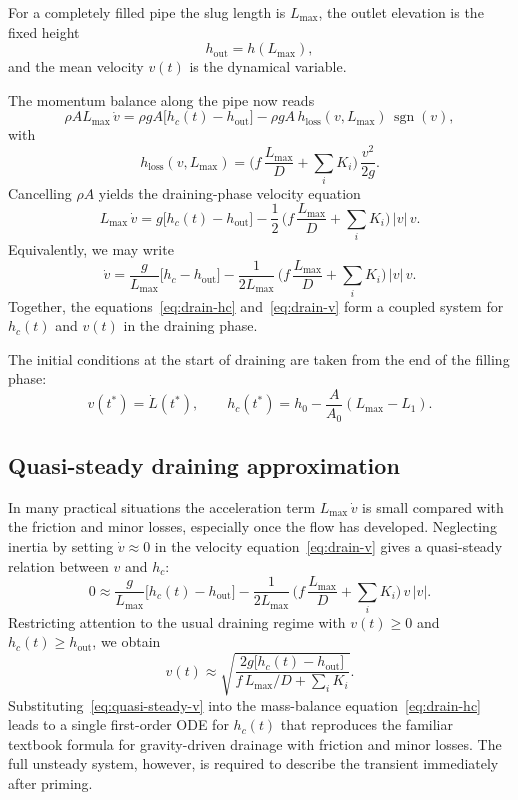 \documentclass[11pt]{article}
\begin{document}
For a completely filled pipe the slug length is $L_{\max}$, the outlet elevation is the fixed height
\[
  h_{\text{out}} = h(L_{\max}),
\]
and the mean velocity $v(t)$ is the dynamical variable.

The momentum balance along the pipe now reads
\[
  \rho A L_{\max}\,\dot v
  = \rho g A\bigl[h_c(t) - h_{\text{out}}\bigr]
    - \rho g A\,h_{\text{loss}}(v,L_{\max})\,\operatorname{sgn}(v),
\]
with
\[
  h_{\text{loss}}(v,L_{\max})
  = \Big(f\,\frac{L_{\max}}{D} + \sum_i K_i\Big)\,\frac{v^2}{2g}.
\]
Cancelling $\rho A$ yields the draining-phase velocity equation
\begin{equation}
  L_{\max}\,\dot v
  = g\bigl[h_c(t) - h_{\text{out}}\bigr]
    - \frac{1}{2}\,\Big(f\,\frac{L_{\max}}{D} + \sum_i K_i\Big)\,|v|\,v.
  \label{eq:drain-v-L}
\end{equation}
Equivalently, we may write
\begin{equation}
  \dot v
  = \frac{g}{L_{\max}}\bigl[h_c - h_{\text{out}}\bigr]
    - \frac{1}{2L_{\max}}\,\Big(f\,\frac{L_{\max}}{D} + \sum_i K_i\Big)\,|v|\,v.
  \label{eq:drain-v}
\end{equation}
Together, the equations~\eqref{eq:drain-hc} and~\eqref{eq:drain-v}
form a coupled system for $h_c(t)$ and $v(t)$ in the draining phase.

The initial conditions at the start of draining are taken from the end of the filling phase:
\[
  v(t^*) = \dot L(t^*),\qquad
  h_c(t^*) = h_0 - \frac{A}{A_0}(L_{\max} - L_1).
\]

\subsection{Quasi-steady draining approximation}

In many practical situations the acceleration term $L_{\max}\,\dot v$ is small compared with the
friction and minor losses, especially once the flow has developed. Neglecting inertia by
setting $\dot v \approx 0$ in the velocity equation~\eqref{eq:drain-v} gives a quasi-steady relation between $v$
and $h_c$:
\[
  0 \approx \frac{g}{L_{\max}}\bigl[h_c(t) - h_{\text{out}}\bigr]
            - \frac{1}{2L_{\max}}\,\Big(f\,\frac{L_{\max}}{D} + \sum_i K_i\Big)\,v\,|v|.
\]
Restricting attention to the usual draining regime with $v(t) \ge 0$ and $h_c(t) \ge h_{\text{out}}$,
we obtain
\begin{equation}
  v(t) \approx
  \sqrt{\frac{2g\bigl[h_c(t) - h_{\text{out}}\bigr]}
             {f\,L_{\max}/D + \sum_i K_i}}.
  \label{eq:quasi-steady-v}
\end{equation}
Substituting~\eqref{eq:quasi-steady-v} into the mass-balance equation~\eqref{eq:drain-hc} leads to a single first-order ODE for
$h_c(t)$ that reproduces the familiar textbook formula for gravity-driven drainage with
friction and minor losses. The full unsteady system, however, is required to describe the
transient immediately after priming.
\end{document}
